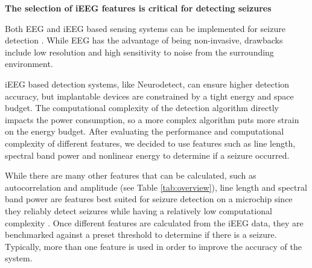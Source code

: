 \documentclass[usletter, 11pt]{extarticle}
\begin{document}
\vspace{11pt}
\textbf{The selection of iEEG features is critical for detecting seizures}

Both EEG and iEEG based sensing systems can be implemented for seizure detection 
\cite{altaf2015, shoaran2016}. While EEG has the advantage of being non-invasive, drawbacks include low resolution and high sensitivity to noise from the surrounding environment.

iEEG based detection systems, like Neurodetect, can ensure higher detection accuracy, but implantable devices are constrained by a tight energy and space budget. The computational complexity of the detection algorithm directly impacts the power consumption, so a more complex algorithm puts more strain on the energy budget. After evaluating the performance and computational complexity of different features, we decided to use features such as line length, spectral band power and nonlinear energy to determine if a seizure occurred.

While there are many other features that can be calculated, such as autocorrelation and amplitude (see Table \ref{tab:overview}), line length and spectral band power are features best suited for seizure detection on a microchip since they reliably detect seizures while having a relatively low computational complexity \cite{logesparan2012}. Once different features are calculated from the iEEG data, they are benchmarked against a preset threshold to determine if there is a seizure. Typically, more than one feature is used in order to improve the accuracy of the system.
\end{document}
